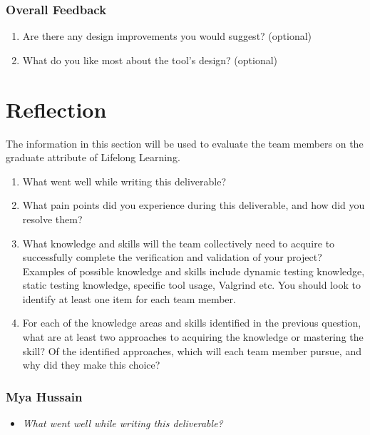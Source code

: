 \documentclass[12pt, titlepage]{article}
\begin{document}
\begin{appendices}
\subsubsection*{Overall Feedback}
\begin{enumerate}
  \item Are there any design improvements you would suggest? (optional)
  \item What do you like most about the tool’s design? (optional)
\end{enumerate}

\newpage{}
\section{Reflection}


The information in this section will be used to evaluate the team members on the
graduate attribute of Lifelong Learning.



\begin{enumerate}
  \item What went well while writing this deliverable? 
  \item What pain points did you experience during this deliverable, and how
    did you resolve them?
  \item What knowledge and skills will the team collectively need to acquire to
  successfully complete the verification and validation of your project?
  Examples of possible knowledge and skills include dynamic testing knowledge,
  static testing knowledge, specific tool usage, Valgrind etc.  You should look to
  identify at least one item for each team member.
  \item For each of the knowledge areas and skills identified in the previous
  question, what are at least two approaches to acquiring the knowledge or
  mastering the skill?  Of the identified approaches, which will each team
  member pursue, and why did they make this choice?
\end{enumerate}

\subsubsection*{Mya Hussain}
\begin{itemize}
  \item \textit{What went well while writing this deliverable?} \\ 
  

\end{itemize}
\end{appendices}
\end{document}
